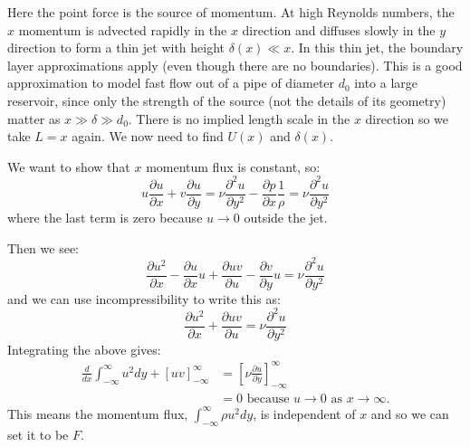 \documentclass[../Main.tex]{subfiles}
\begin{document}
Here the point force is the source of momentum. At high Reynolds numbers, the $x$ momentum is advected rapidly in the $x$ direction and diffuses slowly in the $y$ direction to form a thin jet with height $\delta(x) \ll x$. In this thin jet, the boundary layer approximations apply (even though there are no boundaries). This is a good approximation to model fast flow out of a pipe of diameter $d_0$ into a large reservoir, since only the strength of the source (not the details of its geometry) matter as $x \gg \delta \gg d_0$. There is no implied length scale in the $x$ direction so we take $L = x$ again. We now need to find $U(x)$ and $\delta(x)$.

We want to show that $x$ momentum flux is constant, so:
\begin{equation*}
    u \frac{\partial u}{\partial x} + v \frac{\partial u}{\partial y} = \nu \frac{\partial^{2}u}{\partial y^{2}} - \frac{\partial p}{\partial x} \frac1\rho = \nu \frac{\partial^{2}u}{\partial y^{2}}
\end{equation*}
where the last term is zero because $u \to 0$ outside the jet.

Then we see:
\begin{equation*}
    \frac{\partial u^2}{\partial x} - \frac{\partial u}{\partial x}u + \frac{\partial uv}{\partial u} - \frac{\partial v}{\partial y}u = \nu \frac{\partial^{2}u}{\partial y^{2}}
\end{equation*}
and we can use incompressibility to write this as:
\begin{equation*}
    \frac{\partial u^2}{\partial x} + \frac{\partial uv}{\partial u} = \nu \frac{\partial^{2}u}{\partial y^{2}}
\end{equation*}
Integrating the above gives:
\begin{align*}
    \frac{d}{dx} \int_{-\infty}^{\infty} u^2 dy + \left[uv\right]_{-\infty}^\infty &= \left[\nu \frac{\partial u}{\partial y}\right]_{-\infty}^\infty \\
    &= 0 \text{ because $u \to 0$ as $x \to \infty$}.
\end{align*}
This means the momentum flux, $\int_{-\infty}^{\infty} \rho u^2 dy$, is independent of $x$ and so we can set it to be $F$.
\end{document}
